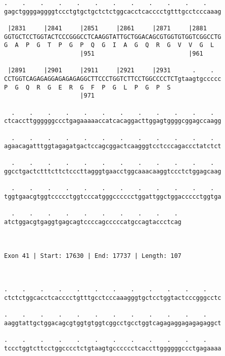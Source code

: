 \documentclass{article}
\begin{document}
\begin{Verbatim}
.    .    .    .    .    .    .    .    .    .    .    .    
gagctggggaggggtccctgtgctgctctctggcacctcacccctgtttgcctcccaaag
                                                            
 |2831     |2841     |2851     |2861     |2871     |2881    
GGTGCTCCTGGTACTCCCGGGCCTCAAGGTATTGCTGGACAGCGTGGTGTGGTCGGCCTG
G  A  P  G  T  P  G  P  Q  G  I  A  G  Q  R  G  V  V  G  L  
                     |951                          |961     
  
 |2891     |2901     |2911     |2921     |2931      .    .  
CCTGGTCAGAGAGGAGAGAGAGGCTTCCCTGGTCTTCCTGGCCCCTCTgtaagtgccccc
P  G  Q  R  G  E  R  G  F  P  G  L  P  G  P  S              
                     |971                                   
  
  .    .    .    .    .    .    .    .    .    .    .    .  
ctcaccttggggggccctgagaaaaaccatcacaggacttggagtggggcggagccaagg
                                                            
  .    .    .    .    .    .    .    .    .    .    .    .  
agaacagatttggtagagatgactccagcggactcaagggtcctcccagaccctatctct
                                                            
  .    .    .    .    .    .    .    .    .    .    .    .  
ggcctgactctttcttctcccttagggtgaacctggcaaacaaggtccctctggagcaag
                                                            
  .    .    .    .    .    .    .    .    .    .    .    .  
tggtgaacgtggtccccctggtcccatgggcccccctggattggctggaccccctggtga
                                                            
  .    .    .    .    .    .    .    .    .    . 
atctggacgtgaggtgagcagtccccagcccccatgccagtaccctcag
                                                 
                                                 
 
Exon 41 | Start: 17630 | End: 17737 | Length: 107



.    .    .    .    .    .    .    .    .    .    .    .    
ctctctggcacctcacccctgtttgcctcccaaagggtgctcctggtactcccgggcctc
                                                            
.    .    .    .    .    .    .    .    .    .    .    .    
aaggtattgctggacagcgtggtgtggtcggcctgcctggtcagagaggagagagaggct
                                                            
.    .    .    .    .    .    .    .    .    .    .    .    
tccctggtcttcctggcccctctgtaagtgcccccctcaccttggggggccctgagaaaa
                                                            

\end{Verbatim}
\end{document}

